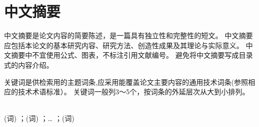 \section*{中文摘要}
中文摘要是论文内容的简要陈述，是一篇具有独立性和完整性的短文。
中文摘要应包括本论文的基本研究内容、研究方法、创造性成果及其理论与实际意义。
中文摘要中不宜使用公式、图表，不标注引用文献编号。
避免将中文摘要写成目录式的内容介绍。

关键词是供检索用的主题词条,应采用能覆盖论文主要内容的通用技术词条(参照相应的技术术语标准）。
关键词一般列3～5个，按词条的外延层次从大到小排列。

~\\
(词) ；(词) ；… ；(词)
\pagebreak